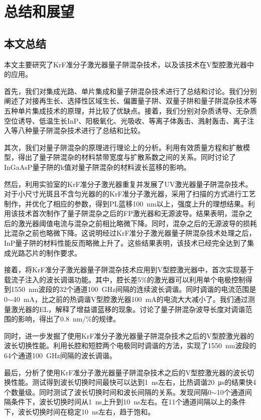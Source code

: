 \documentclass{ZJUthesis}
\begin{document}
\chapter{总结和展望}

\section{本文总结}

本文主要研究了KrF准分子激光器量子阱混杂技术，以及该技术在V型腔激光器中的应用。

首先，我们对集成光路、单片集成和量子阱混杂技术进行了总结和讨论。我们分别阐述了对接再生长、选择性区域生长、偏置量子阱、双量子阱和量子阱混杂技术等五种单片集成技术的原理，并比较了优缺点。接着，我们分别对杂质诱导、无杂质空位诱导、低温生长InP、阳极氧化、光吸收、等离子体轰击、溅射轰击、离子注入等八种量子阱混杂技术进行了总结和比较。

其次，我们对量子阱混杂的原理进行理论上的分析。利用有效质量方程和扩散模型，得出了量子阱混杂的材料禁带宽度与扩散系数之间的关系。同时讨论了InGaAsP量子阱的k值对量子阱混杂的材料波长蓝移的影响。

然后，利用实验室的KrF准分子激光器重复并发展了UV激光器量子阱混杂技术。对于小尺寸光斑且不含匀光器的的KrF准分子激光器，采用了扫描的方式进行工艺制作，并优化了相应的参数，得到PL蓝移100~nm以上，强度上升的理想结果。利用该技术首次制作了量子阱混杂之后的FP激光器和无源波导。结果表明，混杂之后的激光器阈值电流与混杂之前相比略微下降。同时，混杂之后的无源波导的损耗比混杂之前也略微下降。这说明经过KrF准分子激光器量子阱混杂技术处理之后，InP量子阱的材料性能反而略微上升了。这些结果表明，该技术已经完全达到了集成光路芯片的制作要求。

接着，将KrF准分子激光器量子阱混杂技术应用到V型腔激光器中，首次实现基于载流子注入的波长调谐功能。其中，腔长差5\%的激光器可以利用单个电极控制得到1550~nm波段的32个通道100~GHz间隔的连续波长调谐。同时调谐的电流范围是0$\sim$40~mA，比之前的热调谐V型腔激光器100~mA的电流大大减小了。我们通过测量激光器的EL，解释了增益谱蓝移的现象。讨论了量子阱混杂波导长度对调谐范围的影响，得出了0.8~nm/\%的规律。

同时，进一步发掘了使用KrF准分子激光器量子阱混杂技术之后的V型腔激光器的波长切换性能。利用长腔和短腔两个电极同时调谐的方法，实现了1550~nm波段的64个通道100~GHz间隔的波长调谐。

最后，分析了使用KrF准分子激光器量子阱混杂技术之后的V型腔激光器的波长切换性能。测试得到波长切换时间最快可以达到1~ns左右，比热调谐20~μs的结果快4个数量级。同时测试了波长切换时间和波长间隔的关系。发现间隔0$\sim$10个通道间隔条件下，波长切换时间从1~ns上升到10~ns左右。在11个通道间隔以上的条件下，波长切换时间在稳定10~ns左右，趋于饱和。
\end{document}

